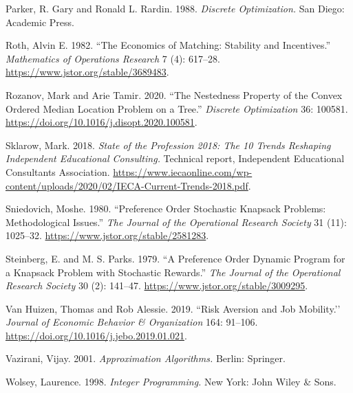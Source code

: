 \documentclass[11pt]{article} %
\theoremstyle{definition}
\theoremstyle{definition}
\begin{document}

Parker, R. Gary and Ronald L. Rardin. 1988. \emph{Discrete Optimization.} San Diego: Academic Press.

Roth, Alvin E. 1982. ``The Economics of Matching: Stability and Incentives.'' \emph{Mathematics of Operations Research} 7 (4): 617--28. \url{https://www.jstor.org/stable/3689483}.

Rozanov, Mark and Arie Tamir. 2020. ``The Nestedness Property of the Convex Ordered Median Location Problem on a Tree.'' \emph{Discrete Optimization} 36: 100581. \url{https://doi.org/10.1016/j.disopt.2020.100581}.

Sklarow, Mark. 2018. \emph{State of the Profession 2018: The 10 Trends Reshaping Independent Educational Consulting.} Technical report, Independent Educational Consultants Association. \url{https://www.iecaonline.com/wp-content/uploads/2020/02/IECA-Current-Trends-2018.pdf}.

Sniedovich, Moshe. 1980. ``Preference Order Stochastic Knapsack Problems: Methodological Issues.'' \emph{The Journal of the Operational Research Society} 31 (11): 1025--32. \url{https://www.jstor.org/stable/2581283}. 

Steinberg, E. and M. S. Parks. 1979. ``A Preference Order Dynamic Program for a Knapsack Problem with Stochastic Rewards.'' \emph{The Journal of the Operational Research Society} 30 (2): 141--47. \url{https://www.jstor.org/stable/3009295}. 


Van Huizen, Thomas and Rob Alessie. 2019. ``Risk Aversion and Job Mobility.’’ \emph{Journal of Economic Behavior \& Organization} 164: 91--106. \url{https://doi.org/10.1016/j.jebo.2019.01.021}.

Vazirani, Vijay. 2001. \emph{Approximation Algorithms.} Berlin: Springer. 

Wolsey, Laurence. 1998. \emph{Integer Programming.} New York: John Wiley \& Sons. 
\end{document}
